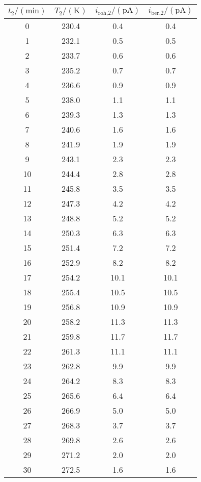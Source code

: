 \label{tab:tabData2_1}
	\begin{tabular}{S[table-format=2.0]S[table-format=3.1]S[table-format=2.1]S[table-format=2.1]}
		\toprule
		{$t_\text{2}/(\si{\minute})$} & {$T_\text{2}/(\si{\kelvin})$} & {$i_\text{roh,2}/(\si{\pico\ampere})$} & {$i_\text{ber,2}/(\si{\pico\ampere})$} \\
		 & 230.4 & 0.4 & 0.4 \\
		 1 & 232.1 & 0.5 & 0.5 \\
		 2 & 233.7 & 0.6 & 0.6 \\
		 3 & 235.2 & 0.7 & 0.7 \\
		 4 & 236.6 & 0.9 & 0.9 \\
		 5 & 238.0 & 1.1 & 1.1 \\
		 6 & 239.3 & 1.3 & 1.3 \\
		 7 & 240.6 & 1.6 & 1.6 \\
		 8 & 241.9 & 1.9 & 1.9 \\
		 9 & 243.1 & 2.3 & 2.3 \\
		10 & 244.4 & 2.8 & 2.8 \\
		11 & 245.8 & 3.5 & 3.5 \\
		12 & 247.3 & 4.2 & 4.2 \\
		13 & 248.8 & 5.2 & 5.2 \\
		14 & 250.3 & 6.3 & 6.3 \\
		15 & 251.4 & 7.2 & 7.2 \\
		16 & 252.9 & 8.2 & 8.2 \\
		17 & 254.2 & 10.1 & 10.1 \\
		18 & 255.4 & 10.5 & 10.5 \\
		19 & 256.8 & 10.9 & 10.9 \\
		20 & 258.2 & 11.3 & 11.3 \\
		21 & 259.8 & 11.7 & 11.7 \\
		22 & 261.3 & 11.1 & 11.1 \\
		23 & 262.8 & 9.9 & 9.9 \\
		24 & 264.2 & 8.3 & 8.3 \\
		25 & 265.6 & 6.4 & 6.4 \\
		26 & 266.9 & 5.0 & 5.0 \\
		27 & 268.3 & 3.7 & 3.7 \\
		28 & 269.8 & 2.6 & 2.6 \\
		29 & 271.2 & 2.0 & 2.0 \\
		30 & 272.5 & 1.6 & 1.6 \\
		\bottomrule
	\end{tabular}
